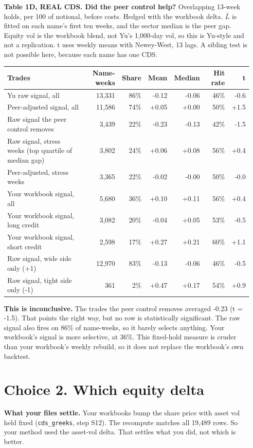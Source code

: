 \documentclass[10pt,a4paper]{article}
\begin{document}
\textbf{Table 1D, REAL CDS. Did the peer control help?} Overlapping 13-week holds, per 100 of notional, before costs. Hedged with the workbook delta. $\bar L$ is fitted on each name's first ten weeks, and the sector median is the peer gap. Equity vol is the workbook blend, not Yu's 1,000-day vol, so this is Yu-style and not a replication. t uses weekly means with Newey-West, 13 lags. A sibling test is not possible here, because each name has one CDS.
{\small
\begin{center}\begin{tabular}{lrrrrrr}\toprule
Trades & Name-weeks & Share & Mean & Median & Hit rate & t \\ \midrule
Yu raw signal, all & 13,331 & 86\% & -0.12 & -0.06 & 46\% & -0.6 \\
Peer-adjusted signal, all & 11,586 & 74\% & +0.05 & +0.00 & 50\% & +1.5 \\
Raw signal the peer control removes & 3,439 & 22\% & -0.23 & -0.13 & 42\% & -1.5 \\
Raw signal, stress weeks (top quartile of median gap) & 3,802 & 24\% & +0.06 & +0.08 & 56\% & +0.4 \\
Peer-adjusted, stress weeks & 3,365 & 22\% & -0.02 & -0.00 & 50\% & -0.0 \\
Your workbook signal, all & 5,680 & 36\% & +0.10 & +0.11 & 56\% & +0.4 \\
Your workbook signal, long credit & 3,082 & 20\% & -0.04 & +0.05 & 53\% & -0.5 \\
Your workbook signal, short credit & 2,598 & 17\% & +0.27 & +0.21 & 60\% & +1.1 \\
Raw signal, wide side only (+1) & 12,970 & 83\% & -0.13 & -0.06 & 46\% & -0.5 \\
Raw signal, tight side only (-1) & 361 & 2\% & +0.47 & +0.17 & 54\% & +0.9 \\
\bottomrule\end{tabular}\end{center}}

\textbf{This is inconclusive.} The trades the peer control removes averaged -0.23 (t = -1.5). That points the right way, but no row is statistically significant. The raw signal also fires on 86\% of name-weeks, so it barely selects anything. Your workbook's signal is more selective, at 36\%. This fixed-hold measure is cruder than your workbook's weekly rebuild, so it does not replace the workbook's own backtest.

\section*{Choice 2. Which equity delta}
\textbf{What your files settle.} Your workbooks bump the share price with asset vol held fixed (\texttt{cds\_greeks}, step S12). The recompute matches all 19,489 rows. So your method used the asset-vol delta. That settles what you did, not which is better.
\end{document}
